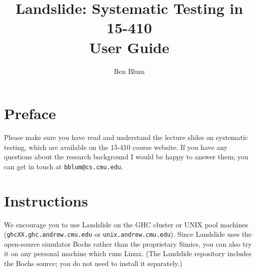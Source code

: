 \documentclass{article}
\begin{document}

\title{\bf Landslide: Systematic Testing in 15-410 \\ User Guide}
\author{Ben Blum}
\date{}
\maketitle

\section{Preface}


Please make sure you have read and understand the lecture slides on systematic testing, which are
available on the 15-410 course website. If you have any questions about the research background I would be
happy to answer them; you can get in touch at {\tt bblum@cs.cmu.edu}.

\section{Instructions}

We encourage you to use Landslide on the GHC cluster or UNIX pool machines ({\tt ghcXX.ghc.andrew.cmu.edu}
or {\tt unix.andrew.cmu.edu}).
Since Landslide uses the open-source simulator Bochs rather than the proprietary Simics,
you can also try it on any personal machine which runs Linux.
(The Landslide repository includes the Bochs source; you do not need to install it separately.)
\end{document}
